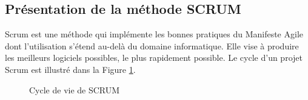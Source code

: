 \subsection{Présentation de la méthode SCRUM}
Scrum est une méthode qui implémente les bonnes pratiques du Manifeste Agile dont l'utilisation s’étend au-delà du domaine informatique. Elle vise à produire les meilleurs logiciels possibles, le plus rapidement possible. Le cycle d'un projet Scrum est illustré dans la Figure  \ref{fig:scrum}.
\begin{figure}[H]
\centering
{}
\caption{Cycle de vie de SCRUM}
\label{fig:scrum}
\end{figure}
